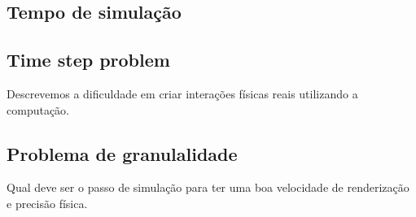 
\subsection{Tempo de simulação}

\subsection{Time step problem}
Descrevemos a dificuldade em criar interações físicas reais utilizando a computação.

\subsection{Problema de granulalidade}
Qual deve ser o passo de simulação para ter uma boa velocidade de renderização e precisão física.
